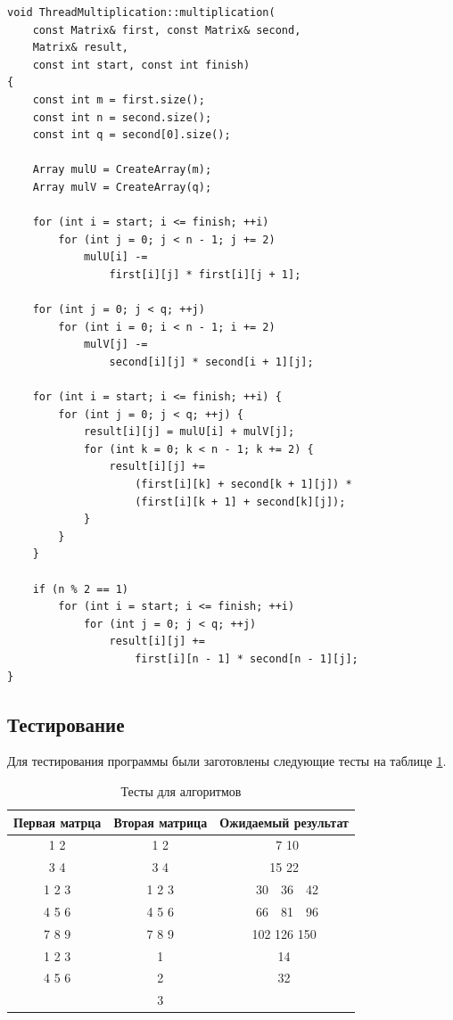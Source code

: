 \documentclass[a4paper,12pt]{article}
\begin{document}
\begin{lstlisting}[caption=Алгоритм Винограда умножения матриц,label=list:vinth]
void ThreadMultiplication::multiplication(
    const Matrix& first, const Matrix& second,
    Matrix& result,
    const int start, const int finish)
{
    const int m = first.size();
    const int n = second.size();
    const int q = second[0].size();

    Array mulU = CreateArray(m);
    Array mulV = CreateArray(q);

    for (int i = start; i <= finish; ++i)
        for (int j = 0; j < n - 1; j += 2)
            mulU[i] -=
                first[i][j] * first[i][j + 1];

    for (int j = 0; j < q; ++j)
        for (int i = 0; i < n - 1; i += 2)
            mulV[j] -=
                second[i][j] * second[i + 1][j];

    for (int i = start; i <= finish; ++i) {
        for (int j = 0; j < q; ++j) {
            result[i][j] = mulU[i] + mulV[j];
            for (int k = 0; k < n - 1; k += 2) {
                result[i][j] +=
                    (first[i][k] + second[k + 1][j]) *
                    (first[i][k + 1] + second[k][j]);
            }
        }
    }

    if (n % 2 == 1)
        for (int i = start; i <= finish; ++i)
            for (int j = 0; j < q; ++j)
                result[i][j] +=
                    first[i][n - 1] * second[n - 1][j];
}
\end{lstlisting}

\subsection{Тестирование}

Для тестирования программы были заготовлены следующие тесты на таблице
\ref{table:test}.

\begin{table}[H]
    \caption{Тесты для алгоритмов}
    \label{table:test}
    \centering
    \begin{tabular}{|c|c|c|}
        \hline
        Первая матрца & Вторая матрица & Ожидаемый результат \\
        \hline
        1 2 & 1 2 & \ 7 10 \\
        3 4 & 3 4 & 15 22 \\
        \hline
        1 2 3 & 1 2 3 & \ 30\ \ 36\ \ 42 \\
        4 5 6 & 4 5 6 & \ 66\ \ 81\ \ 96 \\
        7 8 9 & 7 8 9 & 102 126 150 \\
        \hline
        1 2 3 & 1 & 14 \\
        4 5 6 & 2 & 32 \\
              & 3 & \\
        \hline
    \end{tabular}
\end{table}
\end{document}
